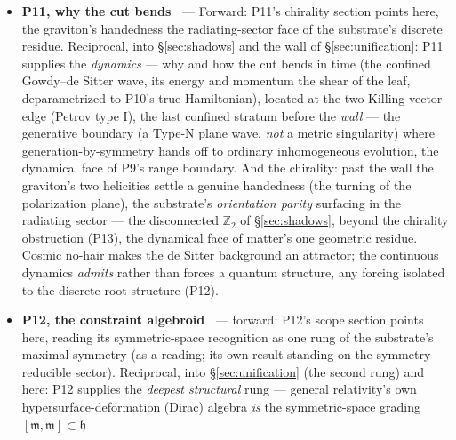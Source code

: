 \documentclass[11pt,a4paper]{article}
\theoremstyle{definition}
\begin{document}
\begin{itemize}
base-dependence the obstruction), P10 supplies the \emph{resolution}:
selecting the cosmic foliation the augmentation forces (empirically by the CMB
[P4], structurally by the horizon [P1]) deparametrizes the frozen constraint
into a \emph{true Hamiltonian}, the frozen and evolving readings the same
canonical content differing only in whether the manifold is granted existence
--- so the problem of time is \emph{dissolved}, not solved, by the same
ontological correction the whole augmentation makes. The closed-$S^3$ graviton
tower deparametrizes to unitary cosmic-time evolution and projects to the
flat-$\Lambda$CDM graviton, matter the bend of the slicing, not ontological
content.
\item \textbf{P11, why the cut bends~\cite{JanzenDynamics}} --- Forward: P11's chirality section points here, the
graviton's handedness the radiating-sector face of the substrate's discrete
residue. Reciprocal, into \S\ref{sec:shadows} and the wall of
\S\ref{sec:unification}: P11 supplies the \emph{dynamics} --- why and how the
cut bends in time (the confined Gowdy--de Sitter wave, its energy and momentum
the shear of the leaf, deparametrized to P10's true Hamiltonian), located at
the two-Killing-vector edge (Petrov type I), the last confined stratum before the \emph{wall} --- the
generative boundary (a Type-N plane wave, \emph{not} a metric singularity)
where generation-by-symmetry hands off to ordinary inhomogeneous evolution,
the dynamical face of P9's range boundary. And the chirality: past the wall
the graviton's two helicities settle a genuine handedness (the turning of the
polarization plane), the substrate's \emph{orientation parity} surfacing in
the radiating sector --- the disconnected $\mathbb{Z}_2$ of
\S\ref{sec:shadows}, beyond the chirality obstruction (P13), the dynamical face of
matter's one geometric residue. Cosmic no-hair makes the de Sitter background
an attractor; the continuous dynamics \emph{admits} rather than forces a
quantum structure, any forcing isolated to the discrete root structure (P12).
\item \textbf{P12, the constraint algebroid~\cite{JanzenAlgebroid}} --- forward: P12's scope section points here,
reading its symmetric-space recognition as one rung of the substrate's
maximal symmetry (as a reading; its own result standing on the
symmetry-reducible sector). Reciprocal, into \S\ref{sec:unification} (the
second rung) and here: P12 supplies the \emph{deepest structural} rung ---
general relativity's own hypersurface-deformation (Dirac) algebra \emph{is}
the symmetric-space grading $[\mathfrak{m},\mathfrak{m}]\subset\mathfrak{h}$

\end{itemize}
\end{document}
